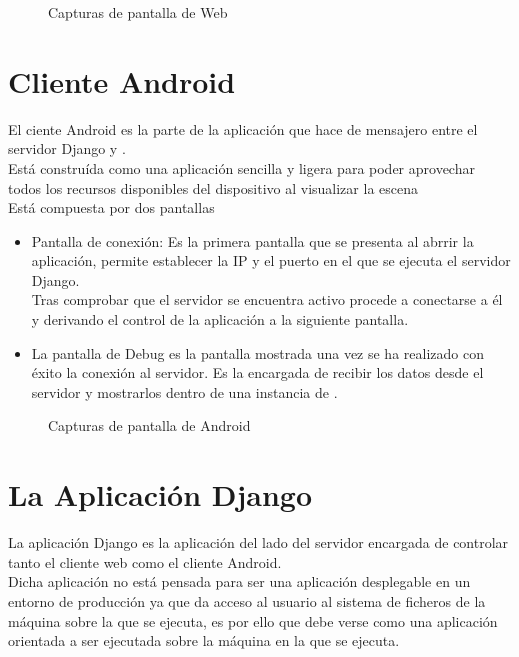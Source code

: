 \begin{figure}[h!]
\centering
{}
\hspace{0mm}
\caption[Capturas de pantalla de \studio Web]{Capturas de pantalla de \studio Web}
\label{fig:capturasweb}
\end{figure}

\section{Cliente Android}
El ciente Android es la parte de la aplicación que hace de mensajero entre el servidor Django y \robotto.\\
Está construída como una aplicación sencilla y ligera para poder aprovechar todos los recursos disponibles del dispositivo al visualizar la escena\\

Está compuesta por dos pantallas
\begin{itemize}
\item Pantalla de conexión: Es la primera pantalla que se presenta al abrrir la aplicación, permite establecer la IP y el puerto en el que se ejecuta el servidor Django.\\
Tras comprobar que el servidor se encuentra activo procede a conectarse a él y derivando el control de la aplicación a la siguiente pantalla.
\item La pantalla de Debug es la pantalla mostrada una vez se ha realizado con éxito la conexión al servidor. Es la encargada de recibir los datos desde el servidor y mostrarlos dentro de una instancia de \robotto.
\end{itemize}

\begin{figure}[h!]
\centering
{}
\caption[Capturas de pantalla de \studio Android]{Capturas de pantalla de \studio Android}
\label{fig:capturasandroid}
\end{figure}

\section{La Aplicación Django}
La aplicación Django es la aplicación del lado del servidor encargada de controlar tanto el cliente web como el cliente Android.\\
Dicha aplicación no está pensada para ser una aplicación desplegable en un entorno de producción ya que da acceso al usuario al sistema de ficheros de la máquina sobre la que se ejecuta, es por ello que debe verse como una aplicación orientada a ser ejecutada sobre la máquina en la que se ejecuta.\\

